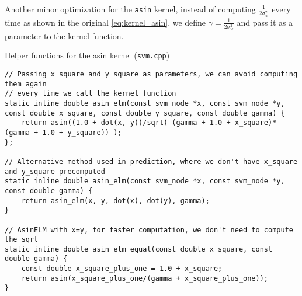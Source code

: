 Another minor optimization for the \texttt{asin} kernel, instead of computing
$\frac{1}{2\sigma_w^2}$ every time as shown in the original
\cref{eq:kernel_asin}, we define $\gamma = \frac{1}{2\sigma_w^2}$ and pass it as
a parameter to the kernel function.

\begin{listing}[H]
    \caption{Helper functions for the asin kernel (\texttt{svm.cpp})}
    \label{lst:svm_cpp_helper}
    \begin{verbatim}
// Passing x_square and y_square as parameters, we can avoid computing them again
// every time we call the kernel function
static inline double asin_elm(const svm_node *x, const svm_node *y, const double x_square, const double y_square, const double gamma) {
    return asin((1.0 + dot(x, y))/sqrt( (gamma + 1.0 + x_square)* (gamma + 1.0 + y_square)) );
};

// Alternative method used in prediction, where we don't have x_square and y_square precomputed
static inline double asin_elm(const svm_node *x, const svm_node *y, const double gamma) {
    return asin_elm(x, y, dot(x), dot(y), gamma);
}

// AsinELM with x=y, for faster computation, we don't need to compute the sqrt
static inline double asin_elm_equal(const double x_square, const double gamma) {
    const double x_square_plus_one = 1.0 + x_square;
    return asin(x_square_plus_one/(gamma + x_square_plus_one));
}
\end{verbatim}
\end{listing}

